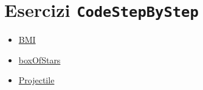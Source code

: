 \documentclass{article}
\begin{document}
\section*{Esercizi \texttt{CodeStepByStep}}
\begin{itemize}
	\item \href{https://www.codestepbystep.com/problem/view/cpp/parameters/BMI}{BMI}
	\item \href{https://www.codestepbystep.com/problem/view/cpp/parameters/boxOfStars}{boxOfStars}
	\item \href{https://www.codestepbystep.com/problem/view/cpp/parameters/Projectile}{Projectile}
\end{itemize}
\end{document}
